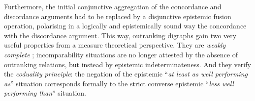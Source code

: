 Furthermore, the initial conjunctive aggregation of the concordance and discordance arguments had to be replaced by a disjunctive epistemic fusion operation, polarising in a logically and epistemically sound way the concordance with the discordance argument. This way, outranking  digraphs gain two very useful properties from a measure theoretical perspective. They are \emph{weakly complete} ; incomparability situations are no longer attested by the absence of outranking relations, but instead by epistemic indeterminateness. And they verify the \emph{coduality principle}: the negation of the epistemic ``\emph{at least as well performing as}'' situation corresponds formally to the strict converse epistemic ``\emph{less well performing than}'' situation.


\clearpage


%